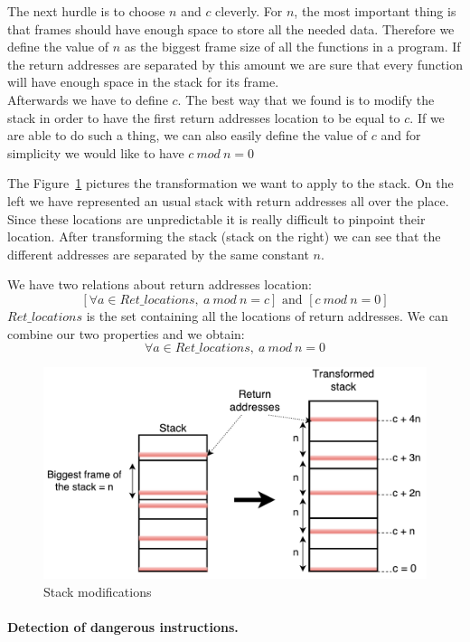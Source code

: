 \documentclass[11pt]{sdm}
\begin{document}
The next hurdle is to choose $n$ and $c$ cleverly. 
For $n$, the most important thing is that frames should have enough space to store all the needed data. Therefore we define the value of $n$ as the biggest frame size of all the functions in a program.
If the return addresses are separated by this amount we are sure that every function will have enough space in the stack for its frame. \\
Afterwards we have to define $c$. The best way that we found is to modify the stack in order to have the first return addresses location to be equal to $c$. If we are able to do such a thing, we can also easily define the value of $c$ and for simplicity we would like to have $c~mod~n = 0$

The Figure~\ref{idea_stack} pictures the transformation we want to apply to the stack. On the left we have represented an usual stack with return addresses all over the place.
Since these locations are unpredictable it is really difficult to pinpoint their location. After transforming the stack (stack on the right) we can see that the different addresses are separated by the same constant $n$.

We have two relations about return addresses location:
$$[\forall a\in Ret\_locations,~a~mod~n=c]\text{ and }[c~mod~n=0]$$
$Ret\_locations$ is the set containing all the locations of return addresses.
We can combine our two properties and we obtain:
{\Large $$\forall a\in Ret\_locations,~a~mod~n=0$$}

\begin{figure}[!ht]
\centering
\includegraphics[scale=0.6]{images/idea_stack.pdf}
\caption{Stack modifications}
\label{idea_stack}
\end{figure}

\paragraph{Detection of dangerous instructions.}
\label{par:Detection of dangerous instructions}
\end{document}
